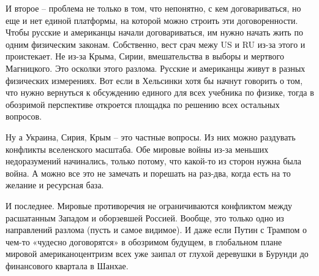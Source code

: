 И второе – проблема не только в том, что непонятно, с кем договариваться, но
еще и нет единой платформы, на которой можно строить эти договоренности. Чтобы
русские и американцы начали договариваться, им нужно начать жить по одним
физическим законам. Собственно, вест срач межу US и RU из-за этого и
проистекает. Не из-за Крыма, Сирии, вмешательства в выборы и мертвого
Магницкого. Это осколки этого разлома. Русские и американцы живут в разных
физических измерениях. Вот если в Хельсинки хотя бы начнут говорить о том, что
нужно вернуться к обсуждению единого для всех учебника по физике, тогда в
обозримой перспективе откроется площадка по решению всех остальных вопросов.

Ну а Украина, Сирия, Крым – это частные вопросы. Из них можно раздувать
конфликты вселенского масштаба. Обе мировые войны из-за меньших недоразумений
начинались, только потому, что какой-то из сторон нужна была война. А можно все
это не замечать и порешать на раз-два, когда есть на то желание и ресурсная
база.

И последнее. Мировые противоречия не ограничиваются конфликтом между
расшатанным Западом и оборзевшей Россией. Вообще, это только одно из
направлений разлома (пусть и самое видимое). И даже если Путин с Трампом о
чем-то «чудесно договорятся» в обозримом будущем, в глобальном плане мировой
американоцентризм всех уже заипал от глухой деревушки в Бурунди до финансового
квартала в Шанхае.

